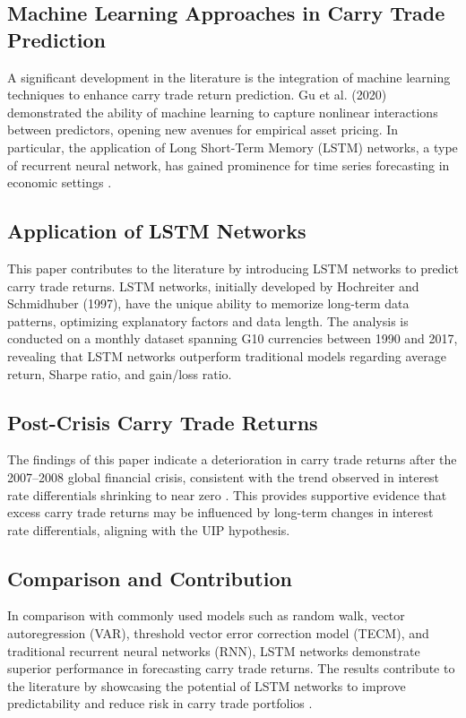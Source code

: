 \documentclass[a4paper,10pt]{article}
\begin{document}
\subsection{Machine Learning Approaches in Carry Trade Prediction}

A significant development in the literature is the integration of machine learning techniques to enhance carry trade return prediction. Gu et al. (2020) ~\cite{gu2020empirical} demonstrated the ability of machine learning to capture nonlinear interactions between predictors, opening new avenues for empirical asset pricing. In particular, the application of Long Short-Term Memory (LSTM) networks, a type of recurrent neural network, has gained prominence for time series forecasting in economic settings \cite{wang2021machine}.

\subsection{Application of LSTM Networks}

This paper contributes to the literature by introducing LSTM networks to predict carry trade returns. LSTM networks, initially developed by Hochreiter and Schmidhuber (1997), have the unique ability to memorize long-term data patterns, optimizing explanatory factors and data length. The analysis is conducted on a monthly dataset spanning G10 currencies between 1990 and 2017, revealing that LSTM networks outperform traditional models regarding average return, Sharpe ratio, and gain/loss ratio.

\subsection{Post-Crisis Carry Trade Returns}

The findings of this paper indicate a deterioration in carry trade returns after the 2007–2008 global financial crisis, consistent with the trend observed in interest rate differentials shrinking to near zero \cite{accominotti2019currency}. This provides supportive evidence that excess carry trade returns may be influenced by long-term changes in interest rate differentials, aligning with the UIP hypothesis.

\subsection{Comparison and Contribution}

In comparison with commonly used models such as random walk, vector autoregression (VAR), threshold vector error correction model (TECM), and traditional recurrent neural networks (RNN), LSTM networks demonstrate superior performance in forecasting carry trade returns. The results contribute to the literature by showcasing the potential of LSTM networks to improve predictability and reduce risk in carry trade portfolios \cite{davis2020economic}.
\end{document}

